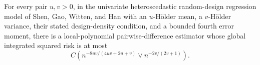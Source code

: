 For every pair \(u,v>0\), in the univariate heteroscedastic random-design regression model of Shen, Gao, Witten, and Han with an \(u\)-Hölder mean, a \(v\)-Hölder variance, their stated design-density condition, and a bounded fourth error moment, there is a local-polynomial pairwise-difference estimator whose global integrated squared risk is at most
\[
C\left(n^{-8uv/(4uv+2u+v)}\vee n^{-2v/(2v+1)}\right).
\]
